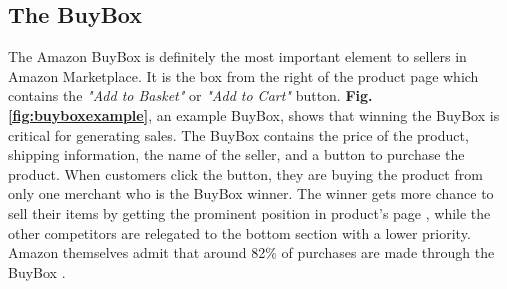 {%
%
%
%
%


\subsection{The BuyBox}
\label{sec:buybox}
The Amazon BuyBox is definitely the most important element to sellers in Amazon Marketplace. It is the box from the right of the product page which contains the \textit{"Add to Basket"} or \textit{"Add to Cart"} button. \textbf{Fig.\ref{fig:buyboxexample}}, an example BuyBox, shows that winning the BuyBox is critical for generating sales. The BuyBox contains the price of the product, shipping information, the name of the seller, and a button to purchase the product. When customers click the button, they are buying the product from only one merchant who is the BuyBox winner. The winner gets more chance to sell their items by getting the prominent position in product's page , while the other competitors are relegated to the bottom section with a lower priority. Amazon themselves admit that around 82\% of purchases are made through the BuyBox \cite{taftamazon}. 

}

